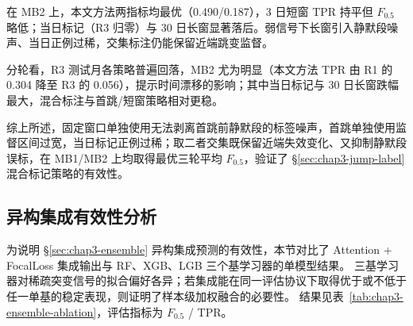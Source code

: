在 MB2 上，本文方法两指标均最优（0.490/0.187），3 日短窗 TPR 持平但 $F_{0.5}$ 略低；当日标记（R3 归零）与 30 日长窗显著落后。弱信号下长窗引入静默段噪声、当日正例过稀，交集标注仍能保留近端跳变监督。

分轮看，R3 测试月各策略普遍回落，MB2 尤为明显（本文方法 TPR 由 R1 的 0.304 降至 R3 的 0.056），提示时间漂移的影响；其中当日标记与 30 日长窗跌幅最大，混合标注与首跳/短窗策略相对更稳。

综上所述，固定窗口单独使用无法剥离首跳前静默段的标签噪声，首跳单独使用监督区间过宽，当日标记正例过稀；取二者交集既保留近端失效变化、又抑制静默段误标，在 MB1/MB2 上均取得最优三轮平均 $F_{0.5}$，验证了 \S\ref{sec:chap3-jump-label} 混合标记策略的有效性。

\subsection{异构集成有效性分析}
\label{sec:chap3-ensemble-ablation}

为说明 \S\ref{sec:chap3-ensemble} 异构集成预测的有效性，本节对比了 Attention + FocalLoss 集成输出与 RF、XGB、LGB 三个基学习器的单模型结果。
三基学习器对稀疏突变信号的拟合偏好各异；若集成能在同一评估协议下取得优于或不低于任一单基的稳定表现，则证明了样本级加权融合的必要性。
结果见表~\ref{tab:chap3-ensemble-ablation}，评估指标为 $F_{0.5}$ / TPR。

